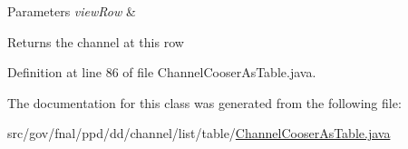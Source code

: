 \begin{DoxyParams}{Parameters}
{\em view\-Row} & \\
\hline
\end{DoxyParams}
\begin{DoxyReturn}{Returns}
the channel at this row 
\end{DoxyReturn}


Definition at line 86 of file Channel\-Cooser\-As\-Table.\-java.



The documentation for this class was generated from the following file\-:\begin{DoxyCompactItemize}
\item 
src/gov/fnal/ppd/dd/channel/list/table/\hyperlink{ChannelCooserAsTable_8java}{Channel\-Cooser\-As\-Table.\-java}\end{DoxyCompactItemize}
